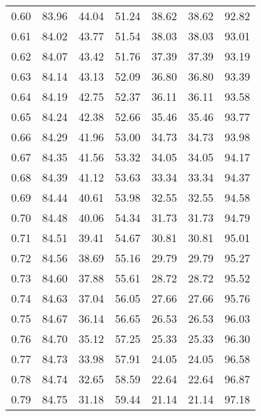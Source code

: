 \begin{tabular}{|c|c|c|c|c|c|c|}
      0.60 &     83.96 &     44.04 &      51.24 &   38.62 &      38.62 &         92.82 \\
      0.61 &     84.02 &     43.77 &      51.54 &   38.03 &      38.03 &         93.01 \\
      0.62 &     84.07 &     43.42 &      51.76 &   37.39 &      37.39 &         93.19 \\
      0.63 &     84.14 &     43.13 &      52.09 &   36.80 &      36.80 &         93.39 \\
      0.64 &     84.19 &     42.75 &      52.37 &   36.11 &      36.11 &         93.58 \\
      0.65 &     84.24 &     42.38 &      52.66 &   35.46 &      35.46 &         93.77 \\
      0.66 &     84.29 &     41.96 &      53.00 &   34.73 &      34.73 &         93.98 \\
      0.67 &     84.35 &     41.56 &      53.32 &   34.05 &      34.05 &         94.17 \\
      0.68 &     84.39 &     41.12 &      53.63 &   33.34 &      33.34 &         94.37 \\
      0.69 &     84.44 &     40.61 &      53.98 &   32.55 &      32.55 &         94.58 \\
      0.70 &     84.48 &     40.06 &      54.34 &   31.73 &      31.73 &         94.79 \\
      0.71 &     84.51 &     39.41 &      54.67 &   30.81 &      30.81 &         95.01 \\
      0.72 &     84.56 &     38.69 &      55.16 &   29.79 &      29.79 &         95.27 \\
      0.73 &     84.60 &     37.88 &      55.61 &   28.72 &      28.72 &         95.52 \\
      0.74 &     84.63 &     37.04 &      56.05 &   27.66 &      27.66 &         95.76 \\
      0.75 &     84.67 &     36.14 &      56.65 &   26.53 &      26.53 &         96.03 \\
      0.76 &     84.70 &     35.12 &      57.25 &   25.33 &      25.33 &         96.30 \\
      0.77 &     84.73 &     33.98 &      57.91 &   24.05 &      24.05 &         96.58 \\
      0.78 &     84.74 &     32.65 &      58.59 &   22.64 &      22.64 &         96.87 \\
      0.79 &     84.75 &     31.18 &      59.44 &   21.14 &      21.14 &         97.18 \\

\end{tabular}
